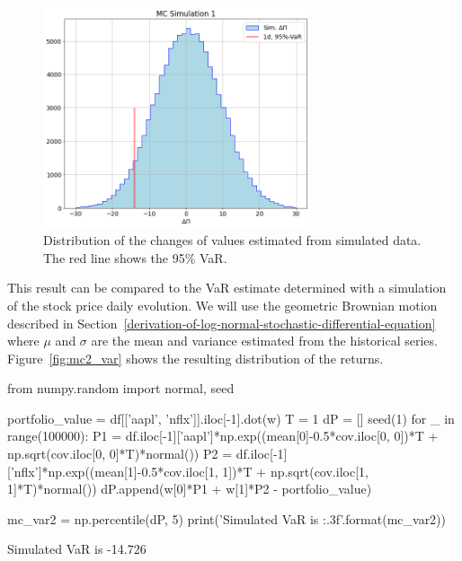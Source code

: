 \begin{figure}[htb]
\centering
\includegraphics[width=0.7\textwidth]{figures/sim1_var}
\caption{Distribution of the changes of values estimated from simulated data. The red line shows the 95\% VaR.}
\label{fig:mc1_var}
\end{figure}

This result can be compared to the VaR estimate determined with a simulation of the stock price daily evolution. We will use the geometric Brownian motion described in Section~\ref{derivation-of-log-normal-stochastic-differential-equation} where $\mu$ and $\sigma$ are the mean and variance estimated from the historical series. Figure~\ref{fig:mc2_var} shows the resulting distribution of the returns.

\begin{ipython}
from numpy.random import normal, seed

portfolio_value = df[['aapl', 'nflx']].iloc[-1].dot(w)
T = 1
dP = []
seed(1)
for _ in range(100000):
  P1 = df.iloc[-1]['aapl']*np.exp((mean[0]-0.5*cov.iloc[0, 0])*T + np.sqrt(cov.iloc[0, 0]*T)*normal())
  P2 = df.iloc[-1]['nflx']*np.exp((mean[1]-0.5*cov.iloc[1, 1])*T + np.sqrt(cov.iloc[1, 1]*T)*normal())
  dP.append(w[0]*P1 + w[1]*P2 - portfolio_value)

mc_var2 = np.percentile(dP, 5)
print('Simulated VaR is {:.3f}'.format(mc_var2))
\end{ipython}
\begin{ioutput}
Simulated VaR is -14.726
\end{ioutput}

